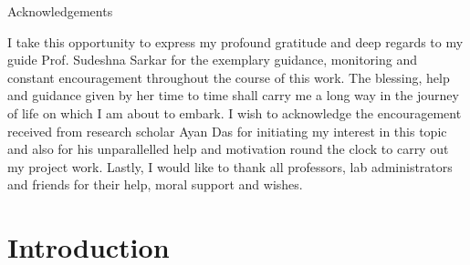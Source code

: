 \documentclass[12pt]{report}
\begin{document}
\pagebreak
\clearpage

\thispagestyle{empty}
\begin{center}
\Huge{Acknowledgements}
\end{center}
\vspace{1cm}

I take this opportunity to express my profound gratitude and deep regards to my guide Prof. Sudeshna Sarkar for the exemplary guidance, monitoring and constant encouragement throughout the course of this work. The blessing, help and guidance given by her time to time shall carry me a long way in the journey of life on which I am about to embark. I wish to acknowledge the encouragement received from research scholar Ayan Das for initiating my interest in this topic and also for his unparallelled help and motivation round the clock to carry out my project work. Lastly, I would like to thank all professors, lab administrators and friends for their help, moral support and wishes.
\pagebreak
\clearpage

\listoffigures
\listoftables

\tableofcontents

\chapter{Introduction}
\end{document}
